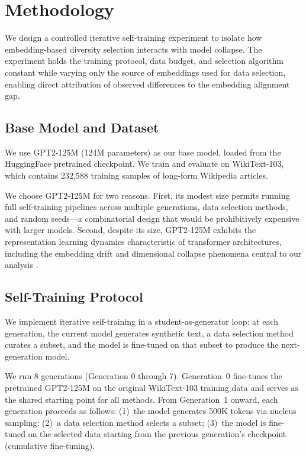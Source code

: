 \section{Methodology}

We design a controlled iterative self-training experiment to isolate how embedding-based diversity selection interacts with model collapse. The experiment holds the training protocol, data budget, and selection algorithm constant while varying only the source of embeddings used for data selection, enabling direct attribution of observed differences to the embedding alignment gap.

\subsection{Base Model and Dataset}

We use GPT2-125M (124M parameters) as our base model, loaded from the HuggingFace pretrained checkpoint. We train and evaluate on WikiText-103, which contains 232,588 training samples of long-form Wikipedia articles.

We choose GPT2-125M for two reasons. First, its modest size permits running full self-training pipelines across multiple generations, data selection methods, and random seeds---a combinatorial design that would be prohibitively expensive with larger models. Second, despite its size, GPT2-125M exhibits the representation learning dynamics characteristic of transformer architectures, including the embedding drift and dimensional collapse phenomena central to our analysis \citep{jing2022understanding}.

\subsection{Self-Training Protocol}

We implement iterative self-training in a student-as-generator loop: at each generation, the current model generates synthetic text, a data selection method curates a subset, and the model is fine-tuned on that subset to produce the next-generation model.

We run 8 generations (Generation 0 through 7). Generation~0 fine-tunes the pretrained GPT2-125M on the original WikiText-103 training data and serves as the shared starting point for all methods. From Generation~1 onward, each generation proceeds as follows: (1)~the model generates 500K tokens via nucleus sampling; (2)~a data selection method selects a subset; (3)~the model is fine-tuned on the selected data starting from the previous generation's checkpoint (cumulative fine-tuning).

